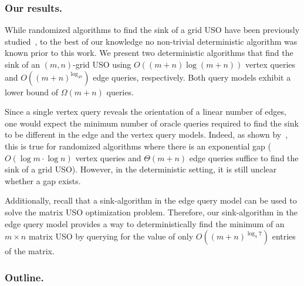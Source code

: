 \documentclass[runningheads,a4paper]{llncs}
\begin{document}


\vspace{-.2in}\subsubsection{Our results.}
While randomized algorithms to find the sink of a grid USO have been previously studied~\cite{grid05,linepoint,grid08,falkthesis}, 
to the best of our knowledge no non-trivial deterministic algorithm was known prior to this work. 
We present two deterministic algorithms that find the sink of an $(m,n)$-grid USO using $O((m+n)\log (m+n))$ vertex queries
and 
$O((m+n)^{\log_47})$ edge queries, respectively.
Both query models exhibit a lower bound of $\Omega(m+n)$ queries.

Since a single vertex query reveals the orientation of a linear number of edges, one would expect the minimum number of  oracle queries required to find the sink to be different in the edge and the vertex query models.
Indeed, as shown by~\citet{grid08}, this is true for randomized algorithms where there is an exponential gap ($O(\log m\cdot \log n)$ vertex queries and $\Theta(m+n)$ edge queries suffice to find the sink of a grid USO).
However, in the deterministic setting, it is still unclear whether a gap exists.

Additionally, recall that a  sink-algorithm in the edge query model can be used to solve the matrix USO optimization problem. 
Therefore, our sink-algorithm in the edge query model provides a way to deterministically find the minimum of an $m\times n$ matrix USO by querying for the value of only $O((m+n)^{\log_4 7})$ entries of the matrix. 

\vspace{-.2in}\subsubsection{Outline.}
\end{document}
